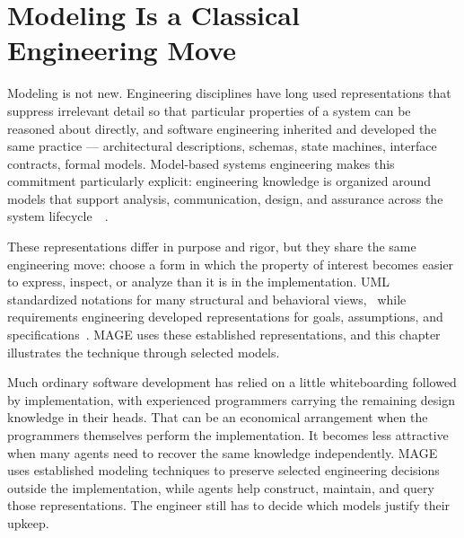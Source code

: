 \section{Modeling Is a Classical Engineering Move}\label{heading:modeling-is-a-classical-engineering-move}


Modeling is not new. Engineering disciplines have long used representations that suppress irrelevant detail so that particular properties of a system can be reasoned about directly, and software engineering inherited and developed the same practice --- architectural descriptions, schemas, state machines, interface contracts, formal models. Model-based systems engineering makes this commitment particularly explicit: engineering knowledge is organized around models that support analysis, communication, design, and assurance across the system lifecycle~\citep{incose2023handbook}~\citep{isoiec42010}.


These representations differ in purpose and rigor, but they share the same engineering move: choose a form in which the property of interest becomes easier to express, inspect, or analyze than it is in the implementation. UML standardized notations for many structural and behavioral views,~\citep{booch-uml} while requirements engineering developed representations for goals, assumptions, and specifications~\citep{vanlamsweerde2009re}. MAGE uses these established representations, and this chapter illustrates the technique through selected models.


Much ordinary software development has relied on a little whiteboarding followed by implementation, with experienced programmers carrying the remaining design knowledge in their heads. That can be an economical arrangement when the programmers themselves perform the implementation. It becomes less attractive when many agents need to recover the same knowledge independently. MAGE uses established modeling techniques to preserve selected engineering decisions outside the implementation, while agents help construct, maintain, and query those representations. The engineer still has to decide which models justify their upkeep.

